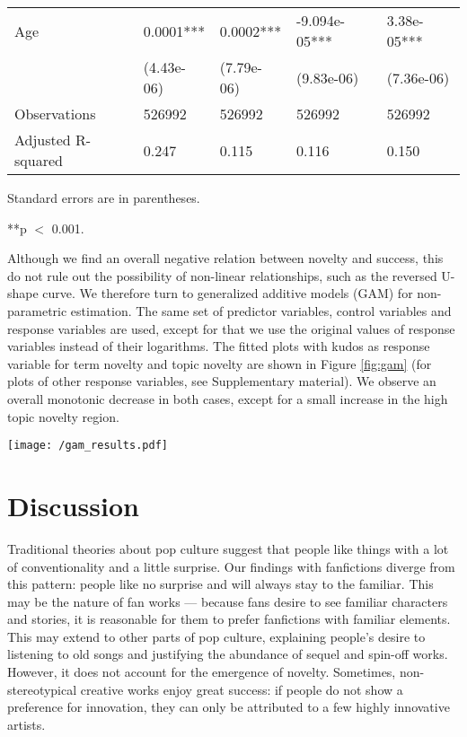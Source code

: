 \documentclass[letterpaper]{article} %
\begin{document}
\begin{table*}
\begin{tabular}[width=0.8\textwidth]{p{4cm}p{3cm}p{3cm}p{3cm}p{3cm}}
Age & 0.0001***& 0.0002*** & -9.094e-05***& 3.38e-05***\\
& (4.43e-06) & (7.79e-06) & (9.83e-06) & (7.36e-06)\\
\hline 
Observations & 526992 & 526992 & 526992 & 526992 \\
Adjusted R-squared & 0.247 & 0.115 & 0.116  & 0.150\\
\bottomrule
\end{tabular}
 \begin{tablenotes}
      \small
      \item Standard errors are in parentheses.
      \item ***p $<$ 0.001.
       \end{tablenotes}
\caption{OLS results}
\label{tab:regression}
\end{table*}%

Although we find an overall negative relation between novelty and success, this do not rule out the possibility of non-linear relationships, such as the reversed U-shape curve. We therefore turn to generalized additive models (GAM) \cite{wood2006generalized} for non-parametric estimation. The same set of predictor variables, control variables and response variables are used, except for that we use the original values of response variables instead of their logarithms. The fitted plots with kudos as response variable for term novelty and topic novelty are shown in Figure \ref{fig:gam} (for plots of other response variables, see Supplementary material). We observe an overall monotonic decrease in both cases, except for a small increase in the high topic novelty region.

\begin{figure*}
    \centering
          \texttt{[image: /gam\_results.pdf]}
        \caption{Fit plots of the generalized additive models.}
        \label{fig:gam}
\end{figure*}

\section*{Discussion}
Traditional theories about pop culture suggest that people like things with a lot of conventionality and a little surprise. Our findings with fanfictions diverge from this pattern: people like no surprise and will always stay to the familiar. This may be the nature of fan works --- because fans desire to see familiar characters and stories, it is reasonable for them to prefer fanfictions with familiar elements. This may extend to other parts of pop culture, explaining people's desire to listening to old songs and justifying the abundance of sequel and spin-off works. However, it does not account for the emergence of novelty. Sometimes, non-stereotypical creative works enjoy great success: if people do not show a preference for innovation, they can only be attributed to a few highly innovative artists.
\end{document}
